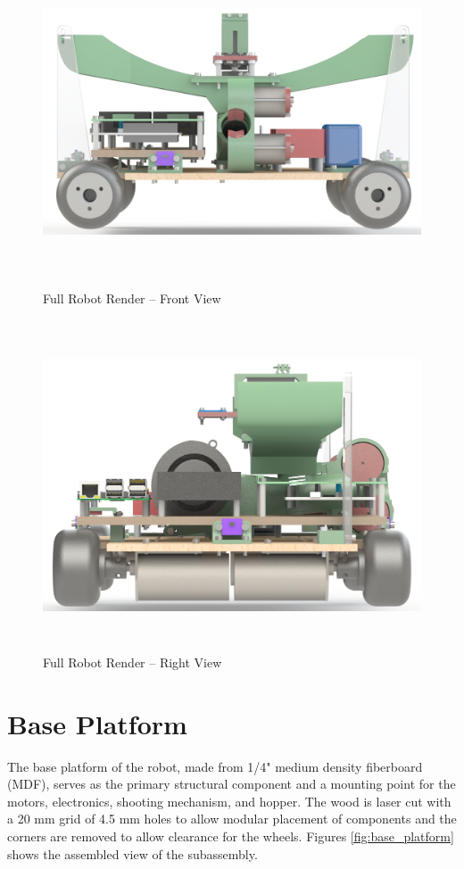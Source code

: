 \begin{figure}[H]   %
	\centering \includegraphics[width=6in, height=3.85in, keepaspectratio]{figures/render_front.png}
	\caption{Full Robot Render -- Front View}	\label{fig:render_front}
\end{figure}
\begin{figure}[H]   %
	\centering \includegraphics[width=6in, height=3.85in, keepaspectratio]{figures/render_right.png}
	\caption{Full Robot Render -- Right View}	\label{fig:render_right}
\end{figure}

\section{Base Platform}
The base platform of the robot, made from 1/4" medium density fiberboard (MDF), serves as the primary structural component and a mounting point for the motors, electronics, shooting mechanism, and hopper. The wood is laser cut with a 20 mm grid of 4.5 mm holes to allow modular placement of components and the corners are removed to allow clearance for the wheels. Figures \ref{fig:base_platform} shows the assembled view of the subassembly.

